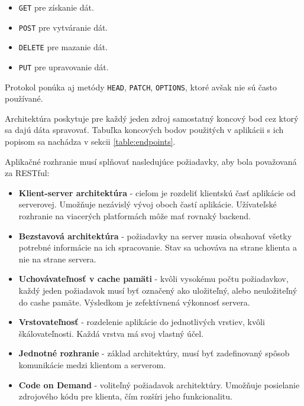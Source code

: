     \begin{itemize}
        \item\texttt{GET} pre získanie dát.
        \item\texttt{POST} pre vytváranie dát.
        \item\texttt{DELETE} pre mazanie dát.
        \item\texttt{PUT} pre upravovanie dát.
    \end{itemize}
    
Protokol ponúka aj metódy \texttt{HEAD}, \texttt{PATCH}, \texttt{OPTIONS}, ktoré avšak nie sú často používané.

\vspace{\baselineskip}

Architektúra poskytuje pre každý jeden zdroj samostatný koncový bod cez ktorý sa dajú dáta spravovať. Tabuľka koncových bodov použitých v aplikácii s ich popisom sa nachádza v sekcii \ref{table:endpoints}.

Aplikačné rozhranie musí splňovať nasledujúce požiadavky, aby bola považovaná za RESTful:

    \begin{itemize}
        \item\textbf{Klient-server architektúra} - cieľom je rozdeliť klientskú časť aplikácie od serverovej. Umožňuje nezávislý vývoj oboch častí aplikácie. Užívateľské rozhranie na viacerých platformách môže mať rovnaký backend.
        \item\textbf{Bezstavová architektúra} - požiadavky na server musia obsahovať všetky potrebné informácie na ich spracovanie. Stav sa uchováva na strane klienta a nie na strane servera.
        \item\textbf{Uchovávateľnosť v cache pamäti} - kvôli vysokému počtu požiadavkov, každý jeden požiadavok musí byť označený ako uložiteľný, alebo neuložiteľný do cashe pamäte. Výsledkom je zefektívnená výkonnosť servera.
        \item\textbf{Vrstovateľnosť} - rozdelenie aplikácie do jednotlivých vrstiev, kvôli škálovateľnosti. Každá vrstva má svoj vlastný účel.
        \item\textbf{Jednotné rozhranie} - základ architektúry, musí byť zadefinovaný spôsob komunikácie medzi klientom a serverom.
        \item\textbf{Code on Demand} - voliteľný požiadavok architektúry. Umožňuje posielanie zdrojového kódu pre klienta, čím rozšíri jeho funkcionalitu.
    \end{itemize}

